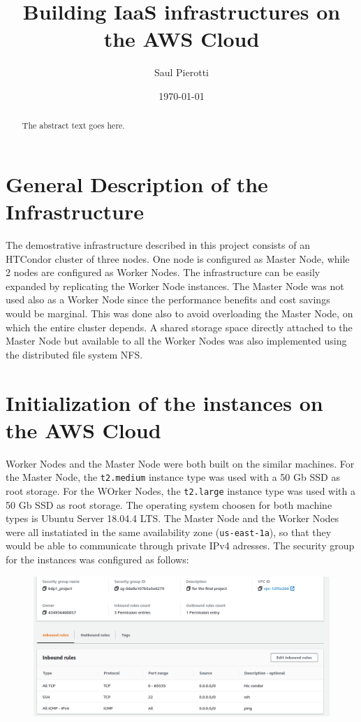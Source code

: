 \documentclass{article}
\begin{document}
\title{Building IaaS infrastructures on the AWS Cloud}
\author{Saul Pierotti}
\date{\today}

\maketitle

\begin{abstract}
The abstract text goes here.
\end{abstract}

\section{General Description of the Infrastructure}
The demostrative infrastructure described in this project consists of an HTCondor cluster of three nodes.
One node is configured as Master Node, while 2 nodes are configured as Worker Nodes.
The infrastructure can be easily expanded by replicating the Worker Node instances.
The Master Node was not used also as a Worker Node since the performance benefits and cost savings would be marginal.
This was done also to avoid overloading the Master Node, on which the entire cluster depends.
A shared storage space directly attached to the Master Node but available to all the Worker Nodes was also implemented using the distributed file system NFS.

\section{Initialization of the instances on the AWS Cloud}
Worker Nodes and the Master Node were both built on the similar machines.
For the Master Node, the \texttt{t2.medium} instance type was used with a 50 Gb SSD as root storage.
For the WOrker Nodes, the \texttt{t2.large} instance type was used with a 50 Gb SSD as root storage.
The operating system choosen for both machine types is Ubuntu Server 18.04.4 LTS.
The Master Node and the Worker Nodes were all instatiated in the same availability zone (\texttt{us-east-1a}), so that they would be able to communicate through private IPv4 adresses.
The security group for the instances was configured as follows:

\begin{figure}[!h]
	\center
	\includegraphics[width=\textwidth]{./images/security-group.png}
\end{figure}
\end{document}
